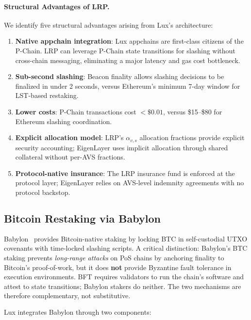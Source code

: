 \documentclass[11pt]{article}
\begin{document}
\paragraph{Structural Advantages of LRP.}
We identify five structural advantages arising from Lux's architecture:

\begin{enumerate}[leftmargin=1.5em]
  \item \textbf{Native appchain integration}: Lux appchains are first-class citizens of the P-Chain.
    LRP can leverage P-Chain state transitions for slashing without cross-chain messaging,
    eliminating a major latency and gas cost bottleneck.
  \item \textbf{Sub-second slashing}: Beacon finality allows slashing decisions to be
    finalized in under 2 seconds, versus Ethereum's minimum 7-day window for LST-based restaking.
  \item \textbf{Lower costs}: P-Chain transactions cost $< \$0.01$, versus \$15--\$80 for
    Ethereum slashing coordination.
  \item \textbf{Explicit allocation model}: LRP's $\alpha_{v,s}$ allocation fractions provide
    explicit security accounting; EigenLayer uses implicit allocation through shared collateral
    without per-AVS fractions.
  \item \textbf{Protocol-native insurance}: The LRP insurance fund is enforced at the protocol
    layer; EigenLayer relies on AVS-level indemnity agreements with no protocol backstop.
\end{enumerate}

\subsection{Bitcoin Restaking via Babylon}
\label{sec:babylon}

Babylon~\cite{babylon2023bitcoin} provides Bitcoin-native staking by locking BTC in
self-custodial UTXO covenants with time-locked slashing scripts.  A critical distinction:
Babylon's BTC staking prevents \emph{long-range attacks} on PoS chains by anchoring
finality to Bitcoin's proof-of-work, but it does \textbf{not} provide Byzantine fault
tolerance in execution environments.  BFT requires validators to run the chain's software
and attest to state transitions; Babylon stakers do neither.  The two mechanisms are
therefore complementary, not substitutive.

Lux integrates Babylon through two components:
\end{document}
